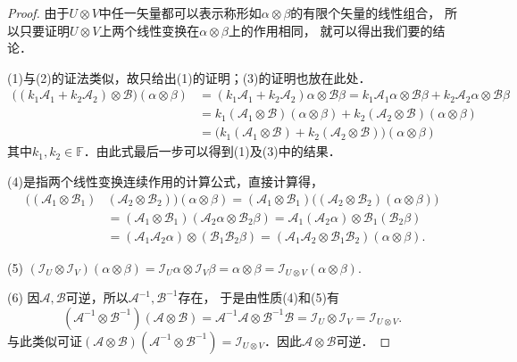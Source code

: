 \begin{proof}
    由于$U\otimes V$中任一矢量都可以表示称形如$\alpha\otimes\beta$的有限个矢量的线性组合，
    所以只要证明$U\otimes V$上两个线性变换在$\alpha\otimes\beta$上的作用相同，
    就可以得出我们要的结论．

    (1)与(2)的证法类似，故只给出(1)的证明；(3)的证明也放在此处．
    \setlength{\mathindent}{0em}
    \begin{align*}
        \bigl((k_1\mathcal{A}_1+k_2\mathcal{A}_2)\otimes \mathcal{B}\bigr) (\alpha\otimes\beta)
        &=(k_1\mathcal{A}_1+k_2\mathcal{A}_2)\alpha \otimes \mathcal{B}\beta
        =k_1\mathcal{A}_1\alpha\otimes \mathcal{B}\beta +k_2\mathcal{A}_2\alpha \otimes \mathcal{B}\beta \\
        &= k_1(\mathcal{A}_1\otimes \mathcal{B})(\alpha\otimes\beta)
         +k_2(\mathcal{A}_2\otimes \mathcal{B})(\alpha\otimes\beta)  \\
        &= \bigl(k_1(\mathcal{A}_1\otimes \mathcal{B})
         +k_2(\mathcal{A}_2\otimes \mathcal{B})\bigr)(\alpha\otimes\beta)
    \end{align*}\setlength{\mathindent}{2em}
    其中$k_1,k_2\in \mathbb{F}$．由此式最后一步可以得到(1)及(3)中的结果．

    (4)是指两个线性变换连续作用的计算公式，直接计算得，
    \begin{equation*}
        \begin{aligned}
            \bigl((\mathcal{A}_1\otimes \mathcal{B}_1)&
              (\mathcal{A}_2\otimes \mathcal{B}_2)\bigr) (\alpha\otimes\beta)
            =(\mathcal{A}_1\otimes \mathcal{B}_1)
            \bigl((\mathcal{A}_2\otimes \mathcal{B}_2) (\alpha\otimes\beta) \bigr)\\
            &=(\mathcal{A}_1\otimes \mathcal{B}_1)
            (\mathcal{A}_2\alpha\otimes \mathcal{B}_2\beta)
            =\mathcal{A}_1(\mathcal{A}_2\alpha)\otimes \mathcal{B}_1(\mathcal{B}_2\beta) \\
            &=(\mathcal{A}_1\mathcal{A}_2\alpha)\otimes (\mathcal{B}_1\mathcal{B}_2\beta)
            =(\mathcal{A}_1\mathcal{A}_2\otimes \mathcal{B}_1\mathcal{B}_2)(\alpha\otimes\beta) .
        \end{aligned}
    \end{equation*}

    (5)
       $ (\mathcal{I}_U\otimes \mathcal{I}_V) (\alpha\otimes\beta) =
        \mathcal{I}_U \alpha \otimes \mathcal{I}_V \beta =
        \alpha\otimes\beta = \mathcal{I}_{U\otimes V}(\alpha\otimes\beta). $

    (6) 因$\mathcal{A},\mathcal{B}$可逆，所以$\mathcal{A}^{-1},\mathcal{B}^{-1}$存在，
    于是由性质(4)和(5)有
    \begin{equation*}
        (\mathcal{A}^{-1}\otimes \mathcal{B}^{-1})(\mathcal{A}\otimes \mathcal{B})
        =\mathcal{A}^{-1}\mathcal{A}\otimes \mathcal{B}^{-1}\mathcal{B}
        =\mathcal{I}_U\otimes \mathcal{I}_V = \mathcal{I}_{U\otimes V} .
    \end{equation*}
    与此类似可证$(\mathcal{A}\otimes \mathcal{B})(\mathcal{A}^{-1}\otimes \mathcal{B}^{-1})
    =\mathcal{I}_{U\otimes V}$．因此$\mathcal{A}\otimes \mathcal{B}$可逆．
\end{proof}

